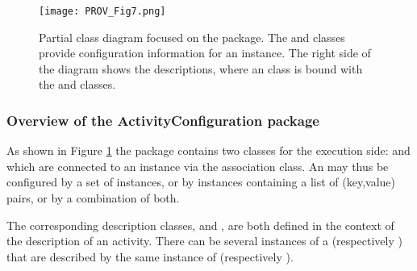 \begin{figure}[hbt]
\centering
\texttt{[image: PROV\_Fig7.png]}
\caption[Partial class diagram focused on the  package.]{Partial class diagram focused on the  package. The  and  classes provide configuration information for an  instance. The right side of the diagram shows the descriptions, where an  class is bound with the  and  classes.}
\label{fig:activityconfig}
\end{figure}


\subsubsection{Overview of the ActivityConfiguration package} \label{sec:configurationpackage}

As shown in Figure \ref{fig:activityconfig} the  package contains two classes for the execution side:  and  which are connected to an  instance via the  association class.
An  may thus be configured by a set of  instances, or by  instances containing a list of (key,value) pairs, or by a combination of both. 


The corresponding description classes,  and , are both defined in the context of the description of an activity. 
There can be several instances of a  (respectively ) that are described by the same instance of  (respectively ).



